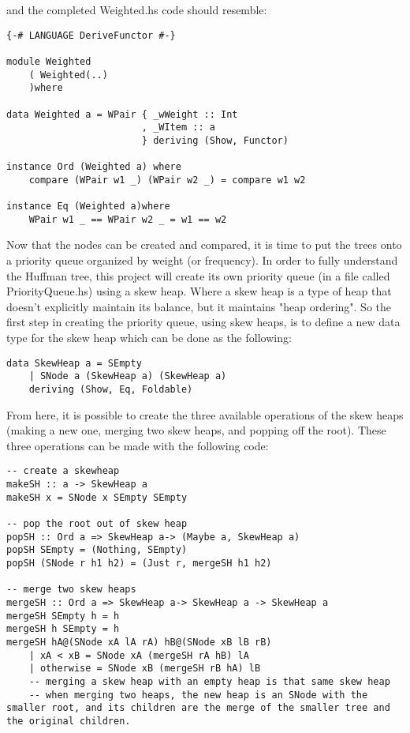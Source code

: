 \documentclass{article}
\begin{document}
and the completed Weighted.hs code should resemble:

\begin{lstlisting}
{-# LANGUAGE DeriveFunctor #-}

module Weighted
    ( Weighted(..)
    )where

data Weighted a = WPair { _wWeight :: Int
                        , _WItem :: a
                        } deriving (Show, Functor)

instance Ord (Weighted a) where
    compare (WPair w1 _) (WPair w2 _) = compare w1 w2

instance Eq (Weighted a)where
    WPair w1 _ == WPair w2 _ = w1 == w2
\end{lstlisting}

Now that the nodes can be created and compared, it is time to put the trees onto a priority queue organized by weight (or frequency).
In order to fully understand the Huffman tree, this project will create its own priority queue (in a file called PriorityQueue.hs) using a skew heap.
Where a skew heap is a type of heap that doesn't explicitly maintain its balance, but it maintains "heap ordering".
So the first step in creating the priority queue, using skew heaps, is to define a new data type for the skew heap which can be done as the following:
\begin{lstlisting}
data SkewHeap a = SEmpty
    | SNode a (SkewHeap a) (SkewHeap a)
    deriving (Show, Eq, Foldable)
\end{lstlisting}

From here, it is possible to create the three available operations of the skew heaps (making a new one, merging two skew heaps, and popping off the root).
These three operations can be made with the following code:
\begin{lstlisting}
-- create a skewheap
makeSH :: a -> SkewHeap a
makeSH x = SNode x SEmpty SEmpty

-- pop the root out of skew heap
popSH :: Ord a => SkewHeap a-> (Maybe a, SkewHeap a)
popSH SEmpty = (Nothing, SEmpty)
popSH (SNode r h1 h2) = (Just r, mergeSH h1 h2)

-- merge two skew heaps
mergeSH :: Ord a => SkewHeap a-> SkewHeap a -> SkewHeap a
mergeSH SEmpty h = h
mergeSH h SEmpty = h
mergeSH hA@(SNode xA lA rA) hB@(SNode xB lB rB)
    | xA < xB = SNode xA (mergeSH rA hB) lA
    | otherwise = SNode xB (mergeSH rB hA) lB
    -- merging a skew heap with an empty heap is that same skew heap
    -- when merging two heaps, the new heap is an SNode with the smaller root, and its children are the merge of the smaller tree and the original children.
\end{lstlisting}
\end{document}

